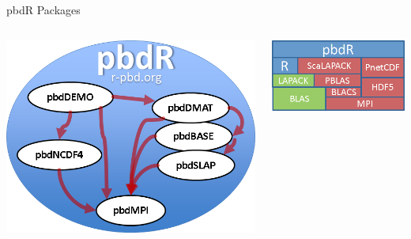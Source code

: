 \begin{frame}
  \begin{block}{pbdR Packages}
    \begin{center}
      \begin{columns}
        \begin{column}{.52\textwidth}
      \includegraphics[scale=.4]{../common/pics/pbdR}
        \end{column}
        \hfill
        \begin{column}{.4\textwidth}
      \includegraphics[scale=.45]{../common/pics/libs}
        \end{column}
      \end{columns}
    \end{center}
  \end{block}
\end{frame}

